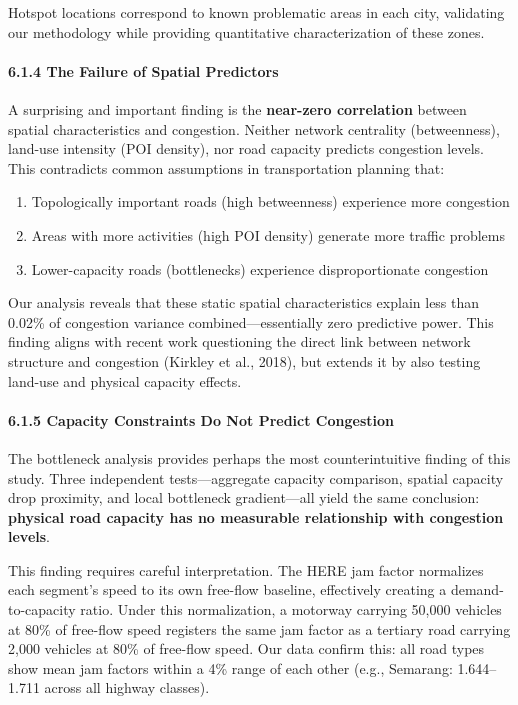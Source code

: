 Hotspot locations correspond to known problematic areas in each city, validating our methodology while providing quantitative characterization of these zones.

\paragraph{6.1.4 The Failure of Spatial Predictors}\label{the-failure-of-spatial-predictors}

A surprising and important finding is the \textbf{near-zero correlation} between spatial characteristics and congestion. Neither network centrality (betweenness), land-use intensity (POI density), nor road capacity predicts congestion levels. This contradicts common assumptions in transportation planning that:

\begin{enumerate}
\def\labelenumi{\arabic{enumi}.}
\tightlist
\item
  Topologically important roads (high betweenness) experience more congestion
\item
  Areas with more activities (high POI density) generate more traffic problems
\item
  Lower-capacity roads (bottlenecks) experience disproportionate congestion
\end{enumerate}

Our analysis reveals that these static spatial characteristics explain less than 0.02\% of congestion variance combined---essentially zero predictive power. This finding aligns with recent work questioning the direct link between network structure and congestion (Kirkley et al., 2018), but extends it by also testing land-use and physical capacity effects.

\paragraph{6.1.5 Capacity Constraints Do Not Predict Congestion}\label{capacity-constraints-do-not-predict-congestion}

The bottleneck analysis provides perhaps the most counterintuitive finding of this study. Three independent tests---aggregate capacity comparison, spatial capacity drop proximity, and local bottleneck gradient---all yield the same conclusion: \textbf{physical road capacity has no measurable relationship with congestion levels}.

This finding requires careful interpretation. The HERE jam factor normalizes each segment's speed to its own free-flow baseline, effectively creating a demand-to-capacity ratio. Under this normalization, a motorway carrying 50,000 vehicles at 80\% of free-flow speed registers the same jam factor as a tertiary road carrying 2,000 vehicles at 80\% of free-flow speed. Our data confirm this: all road types show mean jam factors within a 4\% range of each other (e.g., Semarang: 1.644--1.711 across all highway classes).


